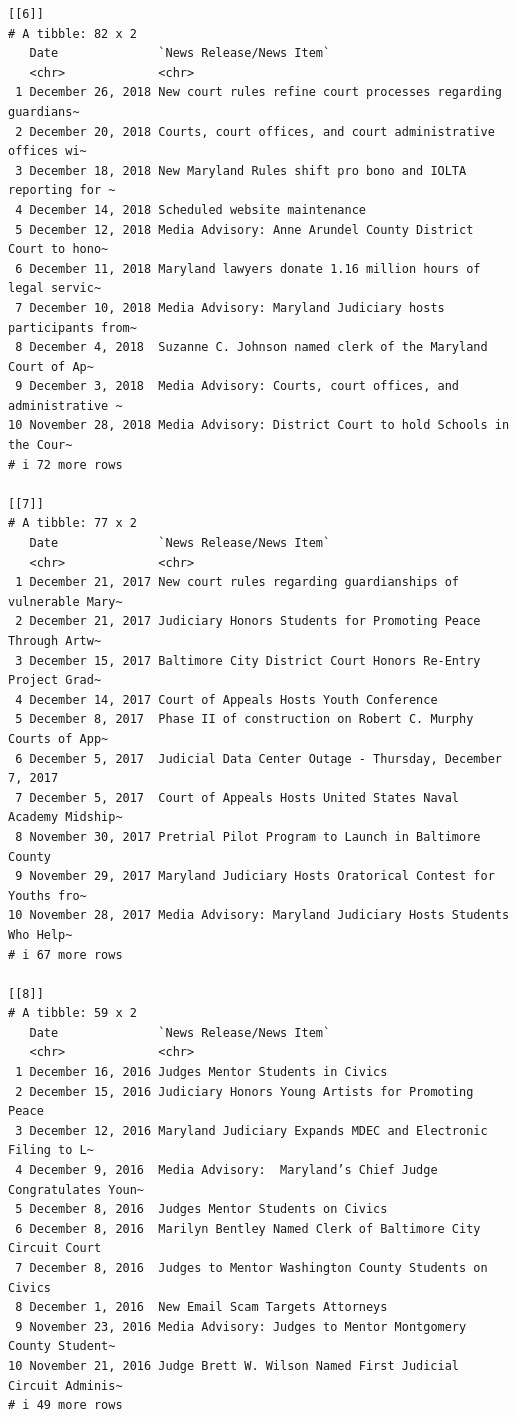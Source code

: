 \documentclass[
  letterpaper,
  DIV=11,
  numbers=noendperiod]{scrreprt}
\begin{document}
\begin{verbatim}
[[6]]
# A tibble: 82 x 2
   Date              `News Release/News Item`                                   
   <chr>             <chr>                                                      
 1 December 26, 2018 New court rules refine court processes regarding guardians~
 2 December 20, 2018 Courts, court offices, and court administrative offices wi~
 3 December 18, 2018 New Maryland Rules shift pro bono and IOLTA reporting for ~
 4 December 14, 2018 Scheduled website maintenance                              
 5 December 12, 2018 Media Advisory: Anne Arundel County District Court to hono~
 6 December 11, 2018 Maryland lawyers donate 1.16 million hours of legal servic~
 7 December 10, 2018 Media Advisory: Maryland Judiciary hosts participants from~
 8 December 4, 2018  Suzanne C. Johnson named clerk of the Maryland Court of Ap~
 9 December 3, 2018  Media Advisory: Courts, court offices, and administrative ~
10 November 28, 2018 Media Advisory: District Court to hold Schools in the Cour~
# i 72 more rows

[[7]]
# A tibble: 77 x 2
   Date              `News Release/News Item`                                   
   <chr>             <chr>                                                      
 1 December 21, 2017 New court rules regarding guardianships of vulnerable Mary~
 2 December 21, 2017 Judiciary Honors Students for Promoting Peace Through Artw~
 3 December 15, 2017 Baltimore City District Court Honors Re-Entry Project Grad~
 4 December 14, 2017 Court of Appeals Hosts Youth Conference                    
 5 December 8, 2017  Phase II of construction on Robert C. Murphy Courts of App~
 6 December 5, 2017  Judicial Data Center Outage - Thursday, December 7, 2017   
 7 December 5, 2017  Court of Appeals Hosts United States Naval Academy Midship~
 8 November 30, 2017 Pretrial Pilot Program to Launch in Baltimore County       
 9 November 29, 2017 Maryland Judiciary Hosts Oratorical Contest for Youths fro~
10 November 28, 2017 Media Advisory: Maryland Judiciary Hosts Students Who Help~
# i 67 more rows

[[8]]
# A tibble: 59 x 2
   Date              `News Release/News Item`                                   
   <chr>             <chr>                                                      
 1 December 16, 2016 Judges Mentor Students in Civics                           
 2 December 15, 2016 Judiciary Honors Young Artists for Promoting Peace         
 3 December 12, 2016 Maryland Judiciary Expands MDEC and Electronic Filing to L~
 4 December 9, 2016  Media Advisory:  Maryland’s Chief Judge Congratulates Youn~
 5 December 8, 2016  Judges Mentor Students on Civics                           
 6 December 8, 2016  Marilyn Bentley Named Clerk of Baltimore City Circuit Court
 7 December 8, 2016  Judges to Mentor Washington County Students on Civics      
 8 December 1, 2016  New Email Scam Targets Attorneys                           
 9 November 23, 2016 Media Advisory: Judges to Mentor Montgomery County Student~
10 November 21, 2016 Judge Brett W. Wilson Named First Judicial Circuit Adminis~
# i 49 more rows


\end{verbatim}
\end{document}
